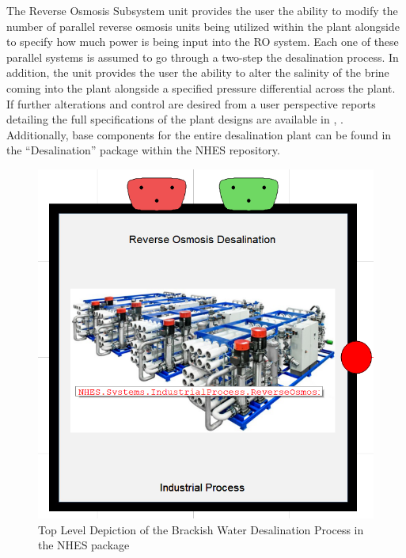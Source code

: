 The Reverse Osmosis Subsystem unit provides the user the ability to modify the number of parallel reverse osmosis units being utilized within the plant alongside to specify how much power is being input into the RO system. Each one of these parallel systems is assumed to go through a two-step the desalination process. In addition, the unit provides the user the ability to alter the salinity of the brine coming into the plant alongside a specified pressure differential across the plant. If further alterations and control are desired from a user perspective reports detailing the full specifications of the plant designs are available in \cite{2018ThermalStorage}, \cite{JongDesalination}. Additionally, base components for the entire desalination plant can be found in the “Desalination” package within the NHES repository. 
 

\begin{figure}[hbtp]
\centering
\includegraphics[scale=0.3]{pics/Desalination Plant.png}
\caption{Top Level Depiction of the Brackish Water Desalination Process in the NHES package}
\label{Top View Reverse Osmosis}
\end{figure}





%

